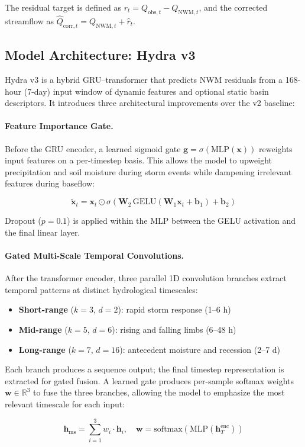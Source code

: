 \documentclass[draft]{agujournal2019}
\begin{document}
The residual target is defined as $r_t = Q_{\text{obs},t} - Q_{\text{NWM},t}$, and the corrected streamflow as $\hat{Q}_{\text{corr},t} = Q_{\text{NWM},t} + \hat{r}_t$.

\subsection{Model Architecture: Hydra v3}

Hydra v3 is a hybrid GRU--transformer \cite{cho2014,vaswani2017} that predicts NWM residuals from a 168-hour (7-day) input window of dynamic features and optional static basin descriptors. It introduces three architectural improvements over the v2 baseline:

\paragraph{Feature Importance Gate.} Before the GRU encoder, a learned sigmoid gate $\mathbf{g} = \sigma(\text{MLP}(\mathbf{x}))$ reweights input features on a per-timestep basis. This allows the model to upweight precipitation and soil moisture during storm events while dampening irrelevant features during baseflow:
\begin{linenomath*}
\begin{equation}
    \tilde{\mathbf{x}}_t = \mathbf{x}_t \odot \sigma\!\left(\mathbf{W}_2 \, \text{GELU}(\mathbf{W}_1 \mathbf{x}_t + \mathbf{b}_1) + \mathbf{b}_2\right)
\end{equation}
\end{linenomath*}
Dropout ($p=0.1$) is applied within the MLP between the GELU activation and the final linear layer.

\paragraph{Gated Multi-Scale Temporal Convolutions.} After the transformer encoder, three parallel 1D convolution branches extract temporal patterns at distinct hydrological timescales:
\begin{itemize}
    \item \textbf{Short-range} ($k{=}3$, $d{=}2$): rapid storm response (1--6 h)
    \item \textbf{Mid-range} ($k{=}5$, $d{=}6$): rising and falling limbs (6--48 h)
    \item \textbf{Long-range} ($k{=}7$, $d{=}16$): antecedent moisture and recession (2--7 d)
\end{itemize}
Each branch produces a sequence output; the final timestep representation is extracted for gated fusion. A learned gate produces per-sample softmax weights $\mathbf{w} \in \mathbb{R}^3$ to fuse the three branches, allowing the model to emphasize the most relevant timescale for each input:
\begin{linenomath*}
\begin{equation}
    \mathbf{h}_{\text{ms}} = \sum_{i=1}^{3} w_i \cdot \mathbf{h}_i, \quad \mathbf{w} = \text{softmax}(\text{MLP}(\mathbf{h}_T^{\text{enc}}))
\end{equation}
\end{linenomath*}
\end{document}
